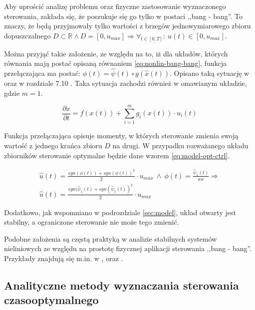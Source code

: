 Aby uprościć analizę problemu oraz fizyczne zastosowanie wyznaczonego sterowania, zakłada się, że poszukuje się go tylko w postaci ,,bang - bang''. To znaczy, że będą przyjmowały tylko wartości z brzegów jednowymiarowego zbioru dopuszczalnego $D \subset \mathbb{R} \land D = [0, u_{max}] \Rightarrow \forall_{t \in [0, T]}:~ u(t) \in [0, u_{max}]$.

Można przyjąć takie założenie, ze względu na to, iż dla układów, których równania mają postać opisaną równaniem \ref{eq:nonlin-bang-bang}, funkcja przełączająca ma postać: $\phi(t) = \hat{\psi}(t) \circ g(\hat{x}(t))$. Opisano taką sytuację w \cite{YiMa2008} oraz w rozdziale 7.10 \cite{AthansOptCtrl}. Taka sytuacja zachodzi również w omawianym układzie, gdzie $m = 1$.

\begin{equation}\label{eq:nonlin-bang-bang}
\frac{\partial x}{\partial t} = f(x(t)) + \sum_{i=1}^{m} g_{i}(x(t)) \cdot u_{i}(t)
\end{equation}

Funkcja przełączająca opisuje momenty, w których sterowanie zmienia swoją wartość z jednego krańca zbioru $D$ na drugi. W przypadku rozważanego układu zbiorników sterowanie optymalne będzie dane wzorem \ref{eq:model-opt-ctrl}.

\begin{equation}\label{eq:model-opt-ctrl}
\begin{array}{lr}
    \hat{u}(t) = \frac{sgn(\phi(t)) + sgn(\phi(t))^{2}}{2} \cdot u_{max} ~ \land ~ \phi(t) = \frac{\hat{\psi}_{1}(t)}{aw} \Rightarrow \\
    \hat{u}(t) = \frac{sgn(\hat{\psi}_{1}(t) + sgn(\hat{\psi}_{1}(t))^{2}}{2} \cdot u_{max}
\end{array}
\end{equation}

Dodatkowo, jak wspomniano w podrozdziale \ref{sec:model}, układ otwarty jest stabilny, a ograniczone sterowanie nie może tego zmienić.

Podobne założenia są częstą praktyką w analizie stabilnych systemów nieliniowych ze względu na prostotę fizycznej aplikacji sterowania ,,bang - bang''. Przykłady znajdują się m.in. w \cite{VakKek82}, \cite{BalSom83} oraz \cite{Itik2016}.

\subsection{Analityczne metody wyznaczania sterowania czasooptymalnego}
\label{sub:toc-ctrl}

